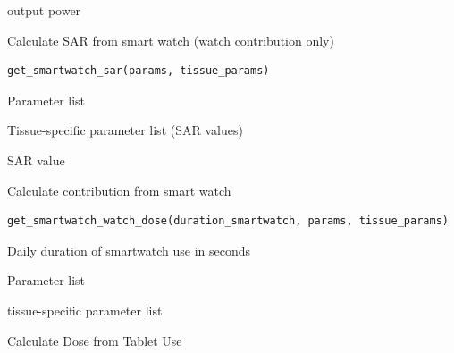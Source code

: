 \documentclass[a4paper]{book}
\begin{document}
%
\begin{Value}
output power
\end{Value}
%
\begin{Description}
Calculate SAR from smart watch (watch contribution only)
\end{Description}
%
\begin{Usage}
\begin{verbatim}
get_smartwatch_sar(params, tissue_params)
\end{verbatim}
\end{Usage}
%
\begin{Arguments}
\begin{ldescription}
\item[\code{params}] Parameter list

\item[\code{tissue\_params}] Tissue-specific parameter list (SAR values)
\end{ldescription}
\end{Arguments}
%
\begin{Value}
SAR value
\end{Value}
%
\begin{Description}
Calculate contribution from smart watch
\end{Description}
%
\begin{Usage}
\begin{verbatim}
get_smartwatch_watch_dose(duration_smartwatch, params, tissue_params)
\end{verbatim}
\end{Usage}
%
\begin{Arguments}
\begin{ldescription}
\item[\code{duration\_smartwatch}] Daily duration of smartwatch use in seconds

\item[\code{params}] Parameter list

\item[\code{tissue\_params}] tissue-specific parameter list
\end{ldescription}
\end{Arguments}
%
\begin{Description}
Calculate Dose from Tablet Use
\end{Description}
\end{document}
